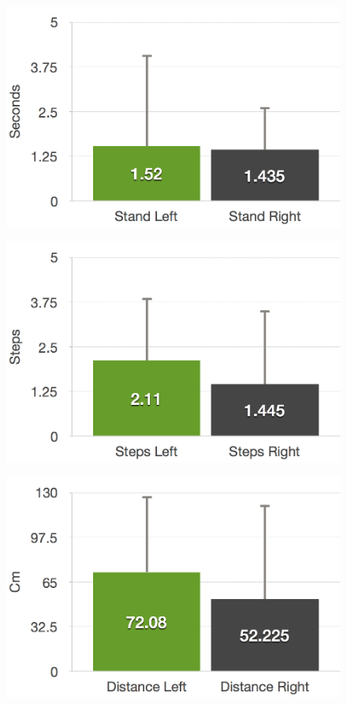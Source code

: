 \begin{figure}[htb]
	\centering
	\begin{minipage}[t]{0.32\linewidth}
		\centering
		\includegraphics[width=1\linewidth]{Pictures/6_4_DIA_StandAllDiff}
		\label{fig:6_4_standAllDiff}
	\end{minipage}
	\hfill
	\begin{minipage}[t]{0.32\linewidth}
		\centering
		\includegraphics[width=1\linewidth]{Pictures/6_4_DIA_StepsAllDiff}
		\label{fig:6_4_stepsAllDiff}
	\end{minipage}
		\hfill
	\begin{minipage}[t]{0.32\linewidth}
		\centering
		\includegraphics[width=1\linewidth]{Pictures/6_4_DIA_DistanceAllDiff}

\end{minipage}
\end{figure}
